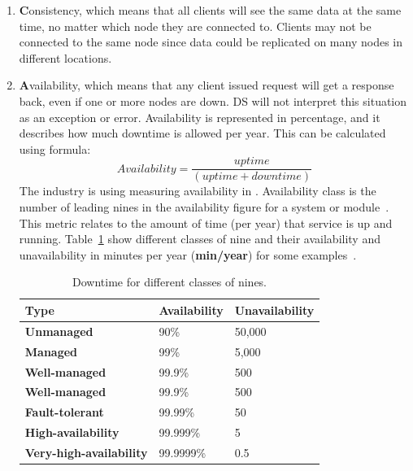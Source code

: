\begin{enumerate} [start=1,label={(\bfseries \arabic*)}]
	\item \textbf{C}onsistency, which means that all clients will see the same data at the same time, no matter which node they are connected to. Clients may not be connected to the same node since data could be replicated on many nodes in different locations.
	\item \textbf{A}vailability, which means that any client issued request will get a response back, even if one or more nodes are down. DS will not interpret this situation as an exception or error. Availability is represented in percentage, and it describes how much downtime is allowed per year. This can be calculated using formula:\\ 
	
	\begin{equation}\label{eq:Availability}
	Availability = \frac{uptime}{ (uptime + downtime)}
	\end{equation}
	The industry is using measuring availability in . Availability class is the number of leading nines in the availability figure for a system or module~\cite{GrayS91}. This metric relates to the amount of time (per year) that service is up and running. Table~\ref{tab:table7} show different classes of nine and their availability and unavailability in minutes per year (\textbf{min/year}) for some examples~\cite{GrayS91}.
	
	\begin{table}[h!]
		\begin{center}
			\begin{tabular}{l|l|l}
				\textbf{Type} & \textbf{Availability} & \textbf{Unavailability} \\
				\hline
				\textbf{Unmanaged} & 90\% & 50,000 \\
				\textbf{Managed} & 99\% & 5,000 \\
				\textbf{Well-managed} & 99.9\% & 500 \\
				\textbf{Well-managed} & 99.9\% & 500 \\
				\textbf{Fault-tolerant} & 99.99\% & 50 \\
				\textbf{High-availability} & 99.999\% & 5 \\
				\textbf{Very-high-availability} & 99.9999\% & 0.5 \\
			\end{tabular}
		\end{center}
		\vspace{-0.5cm}
		\caption{Downtime for different classes of nines.}
		\label{tab:table7}
	\end{table}
	

\end{enumerate}
